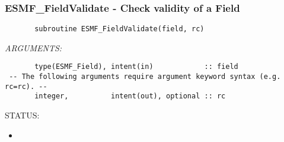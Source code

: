  
\setlength{\oldparskip}{\parskip}
\setlength{\parskip}{1.5ex}
\setlength{\oldparindent}{\parindent}
\setlength{\parindent}{0pt}
\setlength{\oldbaselineskip}{\baselineskip}
\setlength{\baselineskip}{11pt}
 
\def\bv{\begin{verbatim}}
\def\ev{\end{verbatim}}
\def\be{\begin{equation}}
\def\ee{\end{equation}}
\def\bea{\begin{eqnarray}}
\def\eea{\end{eqnarray}}
\def\bi{\begin{itemize}}
\def\ei{\end{itemize}}
\def\bn{\begin{enumerate}}
\def\en{\end{enumerate}}
\def\bd{\begin{description}}
\def\ed{\end{description}}
\def\({\left (}
\def\){\right )}
\def\[{\left [}
\def\]{\right ]}
\def\<{\left  \langle}
\def\>{\right \rangle}
\def\cI{{\cal I}}
\def\diag{\mathop{\rm diag}}
\def\tr{\mathop{\rm tr}}


 
\subsubsection [ESMF\_FieldValidate] {ESMF\_FieldValidate - Check validity of a Field}


 
\begin{verbatim}       subroutine ESMF_FieldValidate(field, rc)\end{verbatim}{\em ARGUMENTS:}
\begin{verbatim}       type(ESMF_Field), intent(in)            :: field 
 -- The following arguments require argument keyword syntax (e.g. rc=rc). --
       integer,          intent(out), optional :: rc   \end{verbatim}
{\sf STATUS:}
   \begin{itemize}
   \item{}
   \end{itemize}
  
